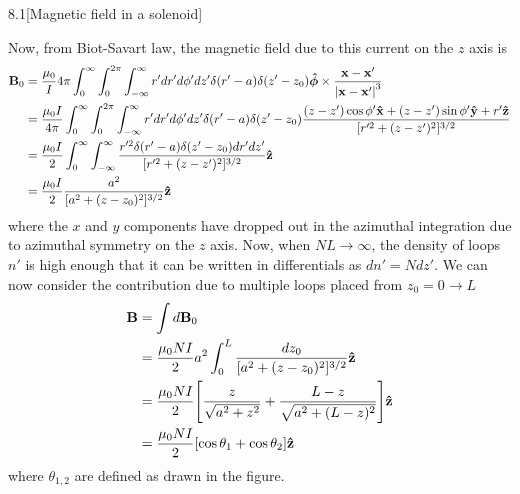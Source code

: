 \documentclass[12pt]{article}
\begin{document}
\begin{problem}{8.1}[Magnetic field in a solenoid]
\begin{solution}
Now, from Biot-Savart law, the magnetic field due to this current on the $z$
axis is
\begin{align}
    \vb{B}_0
    &=\frac{\mu_0}{I}{4\pi}\int_0^\infty\int_0^{2\pi}\int_{-\infty}^\infty 
        r'dr'd\phi'dz'\delta(r'-a)\delta(z'-z_0)
        \bm{\hat{\phi}}\times\frac{\vb{x}-\vb{x}'}{\abs{\vb{x}-\vb{x}'}^3}\notag\\
    &=\frac{\mu_0I}{4\pi}\int_0^\infty\int_0^{2\pi}\int_{-\infty}^\infty 
        r'dr'd\phi'dz'\delta(r'-a)\delta(z'-z_0)
        \frac{(z-z')\cos\phi'\vb{\hat{x}}+(z-z')\sin\phi'\vb{\hat{y}}+r'\vb{\hat{z}}}
            {[r'^2+(z-z')^2]^{3/2}}\notag\\
    &=\frac{\mu_0I}{2}\int_0^\infty\int_{-\infty}^\infty
    \frac{r'^2\delta(r'-a)\delta(z'-z_0)dr'dz'}{[r'^2+(z-z')^2]^{3/2}}\vb{\hat{z}}\notag\\
    &=\frac{\mu_0I}{2}\frac{a^2}{[a^2+(z-z_0)^2]^{3/2}}\vb{\hat{z}}
\end{align}
where the $x$ and $y$ components have dropped out in the azimuthal integration
due to azimuthal symmetry on the $z$ axis. Now, when $NL\to\infty$, the density
of loops $n'$ is high enough that it can be written in differentials as
$dn'=Ndz'$. We can now consider the contribution due to multiple loops placed 
from $z_0=0\to L$
\begin{align}\label{p1a:B}
    \vb{B}
    &=\int d\vb{B}_0\notag\\
    &=\frac{\mu_0NI}{2}a^2\int_0^L\frac{dz_0}{[a^2+(z-z_0)^2]^{3/2}}\vb{\hat{z}}\notag\\
    &=\frac{\mu_0NI}{2}\qty[\frac{z}{\sqrt{a^2+z^2}}+\frac{L-z}{\sqrt{a^2+(L-z)^2}}]\vb{\hat{z}}\notag\\
    &=\frac{\mu_0NI}{2}\qty[\cos\theta_1+\cos\theta_2]\vb{\hat{z}}
\end{align}
where $\theta_{1,2}$ are defined as drawn in the figure.


\end{solution}
\end{problem}
\end{document}
